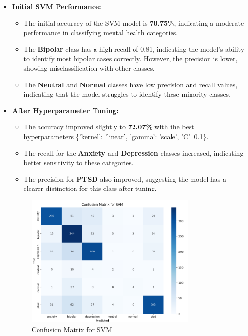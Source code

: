 \begin{itemize}
    \item \textbf{Initial SVM Performance:}
    \begin{itemize}
        \item The initial accuracy of the SVM model is \textbf{70.75\%}, indicating a moderate performance in classifying mental health categories.
        \item The \textbf{Bipolar} class has a high recall of 0.81, indicating the model's ability to identify most bipolar cases correctly. However, the precision is lower, showing misclassification with other classes.
        \item The \textbf{Neutral} and \textbf{Normal} classes have low precision and recall values, indicating that the model struggles to identify these minority classes.
    \end{itemize}

    \item \textbf{After Hyperparameter Tuning:}
    \begin{itemize}
        \item The accuracy improved slightly to \textbf{72.07\%} with the best hyperparameters \{'kernel': 'linear', 'gamma': 'scale', 'C': 0.1\}.
        \item The recall for the \textbf{Anxiety} and \textbf{Depression} classes increased, indicating better sensitivity to these categories.
        \item The precision for \textbf{PTSD} also improved, suggesting the model has a clearer distinction for this class after tuning.
    \end{itemize}

    \begin{figure}[h!]  
    \centering
    \includegraphics[width=0.8\textwidth]{Images/Confusion Matrix SVM.png}  
    \caption{Confusion Matrix for SVM}
    \label{Confusion Matrix SVM}  %
    \end{figure}


\end{itemize}
